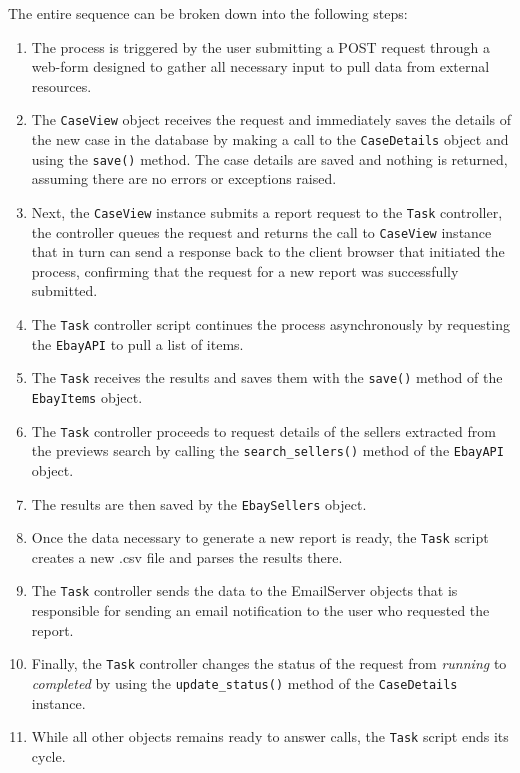 The entire sequence can be broken down into the following steps:
\begin{enumerate}
\item The process is triggered by the user submitting a POST request through a web-form
designed to gather all necessary input to pull data from external
resources.
\item The \texttt{CaseView} object receives the request and immediately saves
the details of the new case in the database by making a call to the
\texttt{CaseDetails} object and using the \texttt{save()} method. The case
details are saved and nothing is returned, assuming there are no errors or
exceptions raised.
\item Next, the \texttt{CaseView} instance submits a report
request to the \texttt{Task} controller, the controller queues the request
and returns the call to \texttt{CaseView} instance that in turn can send a
response back to the client browser that initiated the process, confirming that
the request for a new report was successfully submitted.
\item The \texttt{Task} controller script continues the process
asynchronously by requesting the \texttt{EbayAPI} to pull a list of items.
\item The \texttt{Task} receives the results and saves them with the
\texttt{save()} method of the \texttt{EbayItems} object.
\item The \texttt{Task} controller proceeds to request details of the sellers
extracted from the previews search by calling the \texttt{search\_sellers()}
method of the \texttt{EbayAPI} object.
\item The results are then saved by the \texttt{EbaySellers} object.
\item Once the data necessary to generate a new report is ready, the
\texttt{Task} script creates a new .csv file and parses the results there.
\item The \texttt{Task} controller sends the data to the EmailServer objects
that is responsible for sending an email notification to the user who requested
the report.
\item Finally, the \texttt{Task} controller changes the status of the request
from \emph{running} to \emph{completed} by using the \texttt{update\_status()}
method of the \texttt{CaseDetails} instance.
\item While all other objects remains ready to answer calls, the \texttt{Task}
script ends its cycle.
\end{enumerate}

